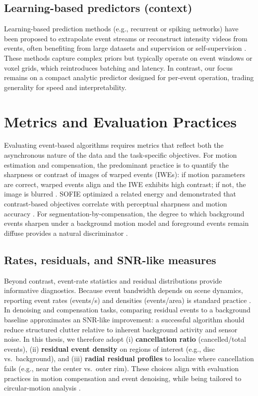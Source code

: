 \subsection{Learning-based predictors (context)}
Learning-based prediction methods (e.g., recurrent or spiking networks) have been proposed to extrapolate event streams or reconstruct intensity videos from events, often benefiting from large datasets and supervision or self-supervision \cite{Rebecq2019E2VID,Gallego2020Survey}. These methods capture complex priors but typically operate on event windows or voxel grids, which reintroduces batching and latency. In contrast, our focus remains on a compact analytic predictor designed for per-event operation, trading generality for speed and interpretability.

\section{Metrics and Evaluation Practices}
\label{sec:metrics-eval}

Evaluating event-based algorithms requires metrics that reflect both the asynchronous nature of the data and the task-specific objectives. For motion estimation and compensation, the predominant practice is to quantify the sharpness or contrast of images of warped events (IWEs): if motion parameters are correct, warped events align and the IWE exhibits high contrast; if not, the image is blurred \cite{Gallego2018CMax}. SOFIE optimized a related energy and demonstrated that contrast-based objectives correlate with perceptual sharpness and motion accuracy \cite{Bardow2016SOFIE}. For segmentation-by-compensation, the degree to which background events sharpen under a background motion model and foreground events remain diffuse provides a natural discriminator \cite{Stoffregen2019Segmentation}.

\subsection{Rates, residuals, and SNR-like measures}
Beyond contrast, event-rate statistics and residual distributions provide informative diagnostics. Because event bandwidth depends on scene dynamics, reporting event rates (events/s) and densities (events/area) is standard practice \cite{Gallego2020Survey}. In denoising and compensation tasks, comparing residual events to a background baseline approximates an SNR-like improvement: a successful algorithm should reduce structured clutter relative to inherent background activity and sensor noise. In this thesis, we therefore adopt (i) \textbf{cancellation ratio} (cancelled/total events), (ii) \textbf{residual event density} on regions of interest (e.g., disc vs.\ background), and (iii) \textbf{radial residual profiles} to localize where cancellation fails (e.g., near the center vs.\ outer rim). These choices align with evaluation practices in motion compensation and event denoising, while being tailored to circular-motion analysis \cite{Bardow2016SOFIE,Gallego2018CMax,Xu2020TCI}.

